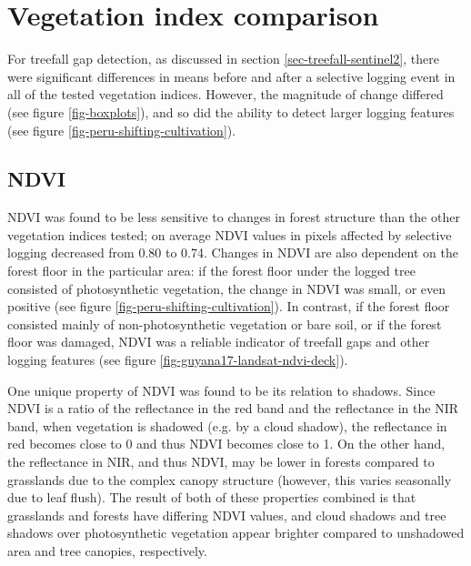 \documentclass[a4paper,12pt]{scrbook}
\begin{document}
\section{Vegetation index comparison}

For treefall gap detection, as discussed in section \ref{sec-treefall-sentinel2}, there were significant differences in means before and after a selective logging event in all of the tested vegetation indices. However, the magnitude of change differed (see figure \ref{fig-boxplots}), and so did the ability to detect larger logging features (see figure \ref{fig-peru-shifting-cultivation}).

\subsection{NDVI}

\ac{NDVI} was found to be less sensitive to changes in forest structure than the other vegetation indices tested; on average NDVI values in pixels affected by selective logging decreased from 0.80 to 0.74. Changes in \ac{NDVI} are also dependent on the forest floor in the particular area: if the forest floor under the logged tree consisted of photosynthetic vegetation, the change in NDVI was small, or even positive (see figure \ref{fig-peru-shifting-cultivation}). In contrast, if the forest floor consisted mainly of non-photosynthetic vegetation or bare soil, or if the forest floor was damaged, \ac{NDVI} was a reliable indicator of treefall gaps and other logging features (see figure \ref{fig-guyana17-landsat-ndvi-deck}).

One unique property of \ac{NDVI} was found to be its relation to shadows. Since \ac{NDVI} is a ratio of the reflectance in the red band and the reflectance in the \ac{NIR} band, when vegetation is shadowed (e.g. by a cloud shadow), the reflectance in red becomes close to 0 and thus \ac{NDVI} becomes close to 1. On the other hand, the reflectance in \ac{NIR}, and thus \ac{NDVI}, may be lower in forests compared to grasslands due to the complex canopy structure (however, this varies seasonally due to leaf flush). The result of both of these properties combined is that grasslands and forests have differing \ac{NDVI} values, and cloud shadows and tree shadows over photosynthetic vegetation appear brighter compared to unshadowed area and tree canopies, respectively.
\end{document}
